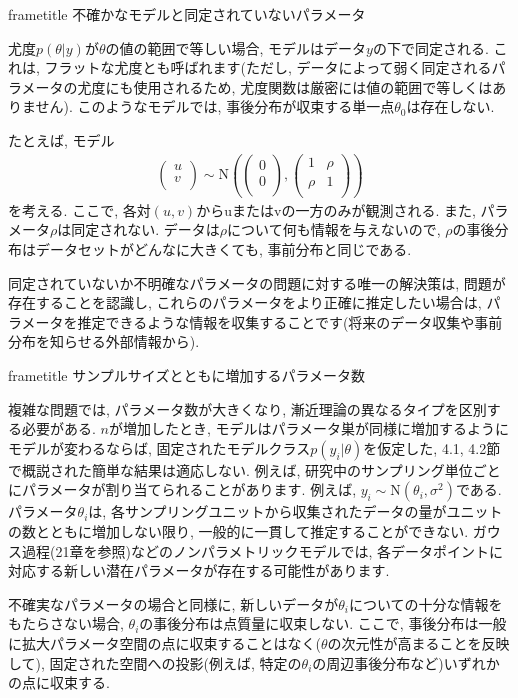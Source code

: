 \documentclass[10pt,dvipdfmx,a4]{beamer}
\newcommand{\eqn}[1]{\begin{align*}#1\end{align*}}
\newcommand{\dbox}[1]{\begin{beamercolorbox}[wd=122mm, sep=0pt, shadow=false, rounded=false]{frametitle} { #1}\end{beamercolorbox}}
\begin{document}
\begin{frame}
\dbox{不確かなモデルと同定されていないパラメータ}
尤度$p(\theta|y)$が$\theta$の値の範囲で等しい場合, モデルはデータ$y$の下で同定される.
これは, フラットな尤度とも呼ばれます(ただし, データによって弱く同定されるパラメータの尤度にも使用されるため, 尤度関数は厳密には値の範囲で等しくはありません).
このようなモデルでは, 事後分布が収束する単一点$\theta_0$は存在しない.

たとえば, モデル
\eqn{\begin{pmatrix}u\\v\\\end{pmatrix}\sim\text{N}\left(\begin{pmatrix}0\\0\\\end{pmatrix}, \begin{pmatrix}1&\rho\\\rho&1\\\end{pmatrix}\right)}
を考える.
ここで, 各対$(u, v)$からuまたはvの一方のみが観測される.
また, パラメータ$\rho$は同定されない.
データは$\rho$について何も情報を与えないので, $\rho$の事後分布はデータセットがどんなに大きくても, 事前分布と同じである.

同定されていないか不明確なパラメータの問題に対する唯一の解決策は, 問題が存在することを認識し, これらのパラメータをより正確に推定したい場合は, パラメータを推定できるような情報を収集することです(将来のデータ収集や事前分布を知らせる外部情報から).
\end{frame}


\begin{frame}
\dbox{サンプルサイズとともに増加するパラメータ数}
複雑な問題では, パラメータ数が大きくなり, 漸近理論の異なるタイプを区別する必要がある.
$n$が増加したとき, モデルはパラメータ巣が同様に増加するようにモデルが変わるならば, 固定されたモデルクラス$p(y_i|\theta)$を仮定した, 
4.1, 4.2節で概説された簡単な結果は適応しない.
例えば, 研究中のサンプリング単位ごとにパラメータが割り当てられることがあります.
例えば, $y_i\sim \text{N}(\theta_i, \sigma^2)$である.
パラメータ$\theta_i$は, 各サンプリングユニットから収集されたデータの量がユニットの数とともに増加しない限り, 一般的に一貫して推定することができない.
ガウス過程(21章を参照)などのノンパラメトリックモデルでは, 各データポイントに対応する新しい潜在パラメータが存在する可能性があります.

不確実なパラメータの場合と同様に, 新しいデータが$\theta_i$についての十分な情報をもたらさない場合, $\theta_i$の事後分布は点質量に収束しない.
ここで, 事後分布は一般に拡大パラメータ空間の点に収束することはなく($\theta$の次元性が高まることを反映して), 固定された空間への投影(例えば, 特定の$\theta_i$の周辺事後分布など)いずれかの点に収束する.
\end{frame}
\end{document}
